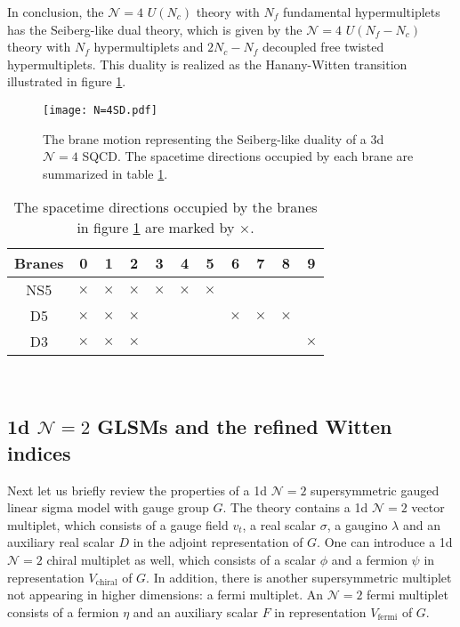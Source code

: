 \documentclass[a4paper,11pt]{article}
\begin{document}
In conclusion, the $\mathcal N = 4$ $U(N_c)$ theory with $N_f$ fundamental hypermultiplets has the Seiberg-like dual theory, which is given by the $\mathcal N = 4$ $U(N_f-N_c)$ theory with $N_f$ hypermultiplets and $2 N_c-N_f$ decoupled free twisted hypermultiplets. This duality is realized as the Hanany-Witten transition illustrated in figure \ref{fig:N=4 SD}.
%
\begin{figure}[tbp]
\centering %
\texttt{[image: N=4SD.pdf]}
\caption{\label{fig:N=4 SD} The brane motion representing the Seiberg-like duality of a 3d $\mathcal N = 4$ SQCD. The spacetime directions occupied by each brane are summarized in table \ref{tab:N=4 SD}.}
\end{figure}
%
%
\begin{table}[tbp]
\centering
\begin{tabular}{|c|cccccccccc|}
\hline
Branes & 0 & 1 & 2 & 3 & 4 & 5 & 6 & 7 & 8 & 9 \\
\hline
NS5 & $\times$ & $\times$ & $\times$ & $\times$ & $\times$ & $\times$ & & & & \\
D5 & $\times$ & $\times$ & $\times$ & & & & $\times$ & $\times$ & $\times$ & \\
D3 & $\times$ & $\times$ & $\times$ & & & & & & & $\times$ \\
\hline
\end{tabular}
\caption{\label{tab:N=4 SD} The spacetime directions occupied by the branes in figure \ref{fig:N=4 SD} are marked by $\times$.}
\end{table}
%
\\



\subsection{1d $\mathcal N = 2$ GLSMs and the refined Witten indices}
\label{sec:1d}

Next let us briefly review the properties of a 1d $\mathcal N = 2$ supersymmetric gauged linear sigma model with gauge group $G$. The theory contains a 1d $\mathcal N = 2$ vector multiplet, which consists of a gauge field $v_t$, a real scalar $\sigma$, a gaugino $\lambda$ and an auxiliary real scalar $D$ in the adjoint representation of $G$. One can introduce a 1d $\mathcal N = 2$ chiral multiplet as well, which consists of a scalar $\phi$ and a fermion $\psi$ in representation $V_\text{chiral}$ of $G$. In addition, there is another supersymmetric multiplet not appearing in higher dimensions: a fermi multiplet. An $\mathcal N = 2$ fermi multiplet consists of a fermion $\eta$ and an auxiliary scalar $F$ in representation $V_\text{fermi}$ of $G$.
\\
\end{document}
